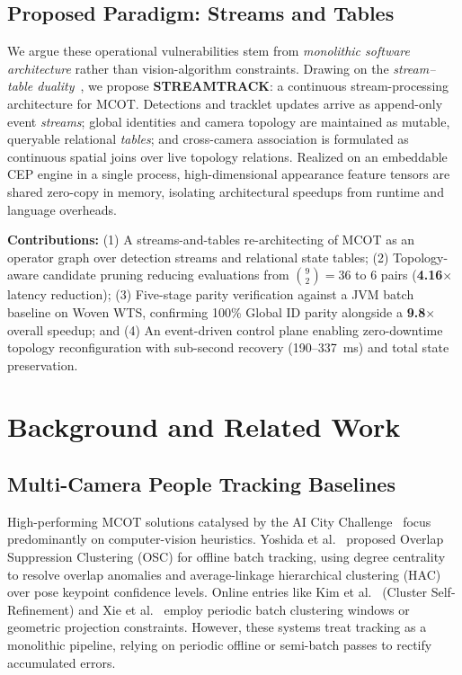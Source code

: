 \documentclass[conference]{IEEEtran}
\begin{document}
\vspace{-0.5em}
\subsection{Proposed Paradigm: Streams and Tables}
We argue these operational vulnerabilities stem from \emph{monolithic software architecture} rather than vision-algorithm constraints. Drawing on the \emph{stream--table duality}~\cite{sax2018streams}, we propose \textbf{STREAMTRACK}: a continuous stream-processing architecture for MCOT. Detections and tracklet updates arrive as append-only event \emph{streams}; global identities and camera topology are maintained as mutable, queryable relational \emph{tables}; and cross-camera association is formulated as continuous spatial joins over live topology relations. Realized on an embeddable CEP engine in a single process, high-dimensional appearance feature tensors are shared zero-copy in memory, isolating architectural speedups from runtime and language overheads.

\textbf{Contributions:} (1) A streams-and-tables re-architecting of MCOT as an operator graph over detection streams and relational state tables; (2) Topology-aware candidate pruning reducing evaluations from $\binom{9}{2}=36$ to $6$ pairs (\textbf{4.16$\times$} latency reduction); (3) Five-stage parity verification against a JVM batch baseline on Woven WTS, confirming 100\% Global ID parity alongside a \textbf{9.8$\times$} overall speedup; and (4) An event-driven control plane enabling zero-downtime topology reconfiguration with sub-second recovery (190--337~ms) and total state preservation.

\section{Background and Related Work}
\label{sec:background}

\subsection{Multi-Camera People Tracking Baselines}
High-performing MCOT solutions catalysed by the AI City Challenge~\cite{yoshida2024overlap,kim2024cluster,xie2024robust,specker2024ocmctrack,yang2024online} focus predominantly on computer-vision heuristics. Yoshida et al.~\cite{yoshida2024overlap} proposed Overlap Suppression Clustering (OSC) for offline batch tracking, using degree centrality to resolve overlap anomalies and average-linkage hierarchical clustering (HAC) over pose keypoint confidence levels. Online entries like Kim et al.~\cite{kim2024cluster} (Cluster Self-Refinement) and Xie et al.~\cite{xie2024robust} employ periodic batch clustering windows or geometric projection constraints. However, these systems treat tracking as a monolithic pipeline, relying on periodic offline or semi-batch passes to rectify accumulated errors.
\end{document}
